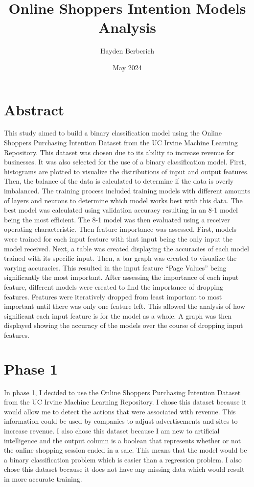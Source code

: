 \documentclass{article}
\title{Online Shoppers Intention Models Analysis}
\author{Hayden Berberich}
\date{May 2024}
\begin{document}
\maketitle

\section{Abstract}
This study aimed to build a binary classification model using the Online Shoppers Purchasing Intention Dataset from the UC Irvine Machine Learning Repository. This dataset was chosen due to its ability to increase revenue for businesses. It was also selected for the use of a binary classification model. First, histograms are plotted to visualize the distributions of input and output features. Then, the balance of the data is calculated to determine if the data is overly imbalanced. The training process included training models with different amounts of layers and neurons to determine which model works best with this data. The best model was calculated using validation accuracy resulting in an 8-1 model being the most efficient. The 8-1 model was then evaluated using a receiver operating characteristic. Then feature importance was assessed. First, models were trained for each input feature with that input being the only input the model received. Next, a table was created displaying the accuracies of each model trained with its specific input. Then, a bar graph was created to visualize the varying accuracies. This resulted in the input feature “Page Values” being significantly the most important. After assessing the importance of each input feature, different models were created to find the importance of dropping features. Features were iteratively dropped from least important to most important until there was only one feature left. This allowed the analysis of how significant each input feature is for the model as a whole. A graph was then displayed showing the accuracy of the models over the course of dropping input features.

\section{Phase 1}

In phase 1, I decided to use the Online Shoppers Purchasing Intention Dataset from the UC Irvine Machine Learning Repository. I chose this dataset because it would allow me to detect the actions that were associated with revenue. This information could be used by companies to adjust advertisements and sites to increase revenue. I also chose this dataset because I am new to artificial intelligence and the output column is a boolean that represents whether or not the online shopping session ended in a sale. This means that the model would be a binary classification problem which is easier than a regression problem. I also chose this dataset because it does not have any missing data which would result in more accurate training. 
\end{document}
